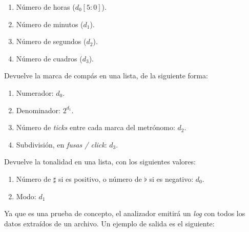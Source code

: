 \begin{description}[style=nextline]
\begin{enumerate}
		\item Número de horas ($d_0[5:0]$).
		\item Número de minutos ($d_1$).
		\item Número de segundos ($d_2$).
		\item Número de cuadros ($d_3$).
	\end{enumerate}

	\item[\code{time(self)}]
	Devuelve la marca de compás en una lista, de la siguiente forma:
	
	\begin{enumerate}
		\item Numerador: $d_0$.
		\item Denominador: $2^{d_1}$.
		\item Número de \textit{ticks} entre cada marca del metrónomo: $d_2$.
		\item Subdivisión, en \textit{fusas / click}: $d_3$.
	\end{enumerate}
	
	\item[\code{key(self)}]
	Devuelve la tonalidad en una lista, con los siguientes valores:
	
	\begin{enumerate}
		\item Número de $\sharp$ si es positivo, o número de $\flat$ si es negativo: $d_0$.
		\item Modo: $d_1$
	\end{enumerate}
\end{description}

Ya que es una prueba de concepto, el analizador emitirá un \textit{log} con  todos los datos extraídos de un archivo. Un ejemplo de salida es el siguiente:

\smallskip


